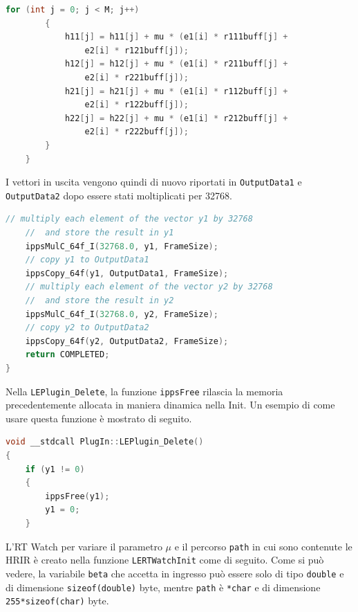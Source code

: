 \documentclass[12pt,a4paper,titlepage]{article}
\begin{document}
\begin{lstlisting}[language=cpp, label=code:agg, caption = Aggiornamento dei filtri h, breaklines = false, captionpos = b]
		for (int j = 0; j < M; j++)
		{
			h11[j] = h11[j] + mu * (e1[i] * r111buff[j] + 
				e2[i] * r121buff[j]);
			h12[j] = h12[j] + mu * (e1[i] * r211buff[j] + 
				e2[i] * r221buff[j]);
			h21[j] = h21[j] + mu * (e1[i] * r112buff[j] + 
				e2[i] * r122buff[j]);
			h22[j] = h22[j] + mu * (e1[i] * r212buff[j] + 
				e2[i] * r222buff[j]);
		}	
	}
\end{lstlisting}
I vettori in uscita vengono quindi di nuovo riportati in \texttt{OutputData1} e \texttt{OutputData2} dopo essere stati moltiplicati per 32768.
\begin{lstlisting}[language=cpp, label=code:output, caption = Aggiornamento delle uscite e scaling, breaklines = false, captionpos = b]
	// multiply each element of the vector y1 by 32768 
	//	and store the result in y1
	ippsMulC_64f_I(32768.0, y1, FrameSize);
	// copy y1 to OutputData1
	ippsCopy_64f(y1, OutputData1, FrameSize);
	// multiply each element of the vector y2 by 32768 
	//	and store the result in y2
	ippsMulC_64f_I(32768.0, y2, FrameSize);
	// copy y2 to OutputData2
	ippsCopy_64f(y2, OutputData2, FrameSize);
	return COMPLETED;
}
\end{lstlisting}
Nella \texttt{LEPlugin\_Delete}, la funzione \texttt{ippsFree} rilascia la memoria precedentemente allocata in maniera dinamica nella Init. Un esempio di come usare questa funzione è mostrato di seguito.
\begin{lstlisting}[language=cpp, label=code:delete_lms, caption = Delete, breaklines = false, captionpos = b]
void __stdcall PlugIn::LEPlugin_Delete()
{
	if (y1 != 0)
	{
		ippsFree(y1);
		y1 = 0;
	}
\end{lstlisting}
L'RT Watch per variare il parametro $\mu$ e il percorso \texttt{path} in cui sono contenute le HRIR è creato nella funzione \texttt{LERTWatchInit} come di seguito. Come si può vedere, la variabile \texttt{beta} che accetta in ingresso può essere solo di tipo \texttt{double} e di dimensione \texttt{sizeof(double)} byte, mentre \texttt{path} è \texttt{*char} e di dimensione \texttt{255*sizeof(char)} byte.
\end{document}
